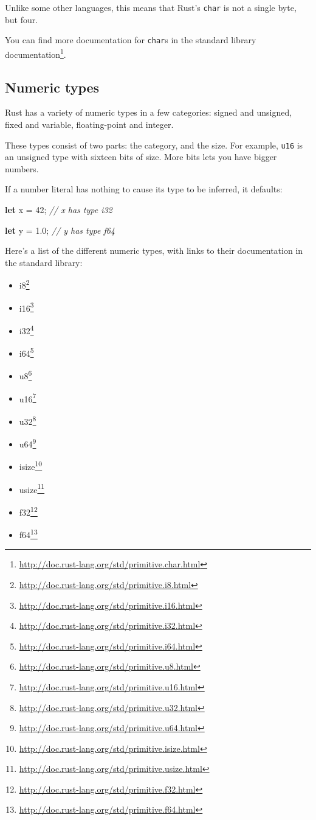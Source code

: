 \documentclass[a4paper,]{book}
\renewcommand*{\hypertarget}[3][\ar]{%
  \def\ar{#2}%
  \label{#1}%
  #3}
\newenvironment{Shaded}{\begin{snugshade}}{\end{snugshade}}
\newcommand{\KeywordTok}[1]{\textcolor[rgb]{0.13,0.29,0.53}{\textbf{{#1}}}}
\newcommand{\DecValTok}[1]{\textcolor[rgb]{0.00,0.00,0.81}{{#1}}}
\newcommand{\CommentTok}[1]{\textcolor[rgb]{0.56,0.35,0.01}{\textit{{#1}}}}
\newcommand{\NormalTok}[1]{{#1}}
\renewcommand{\href}[2]{#2\footnote{\url{#1}}}
\providecommand{\tightlist}{%
  \setlength{\itemsep}{0pt}\setlength{\parskip}{0pt}}
\begin{document}
Unlike some other languages, this means that Rust's \texttt{char} is not
a single byte, but four.

You can find more documentation for \texttt{char}s
\href{http://doc.rust-lang.org/std/primitive.char.html}{in the standard
library documentation}.

\hypertarget{numeric-types}{\subsection{Numeric
types}\label{numeric-types}}

Rust has a variety of numeric types in a few categories: signed and
unsigned, fixed and variable, floating-point and integer.

These types consist of two parts: the category, and the size. For
example, \texttt{u16} is an unsigned type with sixteen bits of size.
More bits lets you have bigger numbers.

If a number literal has nothing to cause its type to be inferred, it
defaults:

\begin{Shaded}
\begin{Highlighting}[]
\KeywordTok{let} \NormalTok{x = }\DecValTok{42}\NormalTok{; }\CommentTok{// x has type i32}

\KeywordTok{let} \NormalTok{y = }\DecValTok{1.0}\NormalTok{; }\CommentTok{// y has type f64}
\end{Highlighting}
\end{Shaded}

Here's a list of the different numeric types, with links to their
documentation in the standard library:

\begin{itemize}
\tightlist
\item
  \href{http://doc.rust-lang.org/std/primitive.i8.html}{i8}
\item
  \href{http://doc.rust-lang.org/std/primitive.i16.html}{i16}
\item
  \href{http://doc.rust-lang.org/std/primitive.i32.html}{i32}
\item
  \href{http://doc.rust-lang.org/std/primitive.i64.html}{i64}
\item
  \href{http://doc.rust-lang.org/std/primitive.u8.html}{u8}
\item
  \href{http://doc.rust-lang.org/std/primitive.u16.html}{u16}
\item
  \href{http://doc.rust-lang.org/std/primitive.u32.html}{u32}
\item
  \href{http://doc.rust-lang.org/std/primitive.u64.html}{u64}
\item
  \href{http://doc.rust-lang.org/std/primitive.isize.html}{isize}
\item
  \href{http://doc.rust-lang.org/std/primitive.usize.html}{usize}
\item
  \href{http://doc.rust-lang.org/std/primitive.f32.html}{f32}
\item
  \href{http://doc.rust-lang.org/std/primitive.f64.html}{f64}
\end{itemize}
\end{document}

